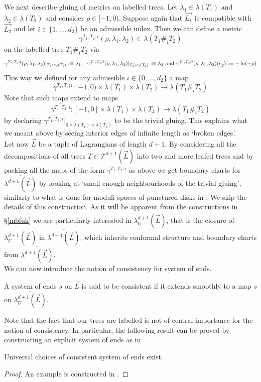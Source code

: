 We next describe gluing of metrics on labelled trees. Let $\lambda_1\in \lambda(T_1)$ and $\lambda_2\in \lambda(T_2)$ and consider $\rho\in [-1,0)$. Suppose again that $\vec{L_1}$ is compatible with $\vec{L_2}$ and let $i\in \{1,\ldots, d_2\}$ be an admissible index. Then we can define a metric $$\gamma^{T_1,T_2;i}(\rho, \lambda_1,\lambda_2)\in \lambda(T_1\#_iT_2)$$ on the labelled tree $T_1\#_iT_2$ via $$\gamma^{T_1,T_2;i}(\rho, \lambda_1,\lambda_2)|_{T_1\setminus e_0(T_1)} :\equiv \lambda_1, \ \ \gamma^{T_1,T_2;i}(\rho, \lambda_1,\lambda_2)|_{T_2\setminus e_i(T_2)} :\equiv \lambda_2 \textnormal{   and   } \gamma^{T_1,T_2;i}(\rho, \lambda_1,\lambda_2)(e_g):=-\ln(-\rho)$$ This way we defined for any admissible $i\in\{0,\ldots, d_2\}$ a map $$\gamma^{T_1,T_2;i}: [-1,0)\times \lambda(T_1)\times \lambda(T_2)\to \lambda(T_1\#_iT_2)$$ Note that such maps extend to maps $$\overline{\gamma^{T_1,T_2;i}}:  [-1,0]\times \lambda(T_1)\times \lambda(T_2)\to\overline{\lambda(T_1\#_iT_2)}$$ by declaring $\overline{\gamma^{T_1,T_2;i}}|_{0\times \lambda(T_1)\times \lambda(T_2)}$ to be the trivial gluing. This explains what we meant above by seeing interior edges of infinite length as `broken edges'.\\
Let now $\vec{L}$ be a tuple of Lagrangians of length $d+1$. By considering all the decompositions of all trees $T\in \mathcal{T}^{d+1}(\vec{L})$ into two and more leafed trees and by packing all the maps of the form $\overline{\gamma^{T_1,T_2;i}}$ as above we get boundary charts for $\overline{\lambda^{d+1}(\vec{L})}$ by looking at `small enough neighbourhoods of the trivial gluing', similarly to what is done for moduli spaces of punctured disks in \cite{Se:book-fukaya-categ}. We skip the details of this construction. As it will be apparent from the constructions in \S \ref{mbfuk} we are particularly interested in $\overline{\lambda_U^{d+1}(\vec{L})}$, that is the closure of $\lambda_U^{d+1}(\vec{L})$ in $\overline{\lambda^{d+1}(\vec{L})}$, which inherits conformal structure and boundary charts from $\overline{\lambda^{d+1}(\vec{L})}$.\\

We can now introduce the notion of consistency for system of ends.

\begin{dfn}
	A system of ends $s$ on $\vec{L}$ is said to be consistent if it extends smoothly to a map $\overline{s}$ on $\overline{\lambda^{d+1}_U(\vec{L})}$.
\end{dfn}\noindent Note that the fact that our trees are labelled is not of central importance for the notion of consistency. In particular, the following result can be proved by constructing an explicit system of ends as in \cite{Charest2012SourceComplexes}.
\begin{lemma}
	Universal choices of consistent system of ends exist.
\end{lemma}
\begin{proof}
	An example is constructed in \cite[Section 1.3]{Charest2012SourceComplexes}.
\end{proof}

